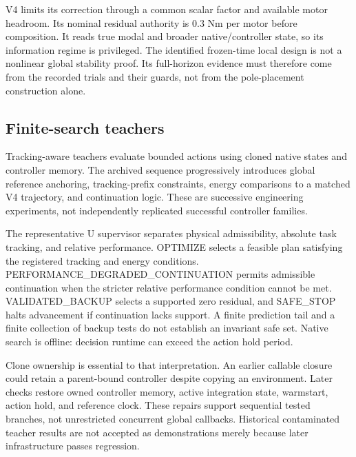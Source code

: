 V4 limits its correction through a common scalar factor and available motor headroom. Its nominal residual authority is $0.3$ Nm per motor before composition. It reads true modal and broader native/controller state, so its information regime is privileged. The identified frozen-time local design is not a nonlinear global stability proof. Its full-horizon evidence must therefore come from the recorded trials and their guards, not from the pole-placement construction alone.

\subsection{Finite-search teachers}
Tracking-aware teachers evaluate bounded actions using cloned native states and controller memory. The archived sequence progressively introduces global reference anchoring, tracking-prefix constraints, energy comparisons to a matched V4 trajectory, and continuation logic. These are successive engineering experiments, not independently replicated successful controller families.

The representative U supervisor separates physical admissibility, absolute task tracking, and relative performance. OPTIMIZE selects a feasible plan satisfying the registered tracking and energy conditions. PERFORMANCE\_DEGRADED\_CONTINUATION permits admissible continuation when the stricter relative performance condition cannot be met. VALIDATED\_BACKUP selects a supported zero residual, and SAFE\_STOP halts advancement if continuation lacks support. A finite prediction tail and a finite collection of backup tests do not establish an invariant safe set. Native search is offline: decision runtime can exceed the action hold period.

Clone ownership is essential to that interpretation. An earlier callable closure could retain a parent-bound controller despite copying an environment. Later checks restore owned controller memory, active integration state, warmstart, action hold, and reference clock. These repairs support sequential tested branches, not unrestricted concurrent global callbacks. Historical contaminated teacher results are not accepted as demonstrations merely because later infrastructure passes regression.

